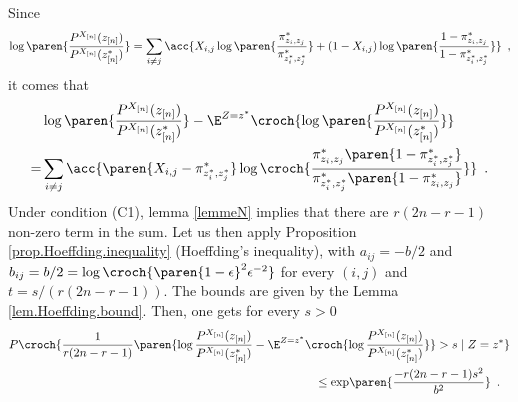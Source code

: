 \documentclass[11pt]{article}
\newcommand{\Xn}{X_{[n]}}
\newcommand{\zn}{z_{[n]}}
\newcommand{\PXn}{P^{\Xn}}
\begin{document}
Since
\begin{align*}
        \log \paren{\frac{\PXn(\zn)}{\PXn(\zn^*)}}=\sum_{i\neq j} \acc{X_{i,j}\log\paren{\frac{\pi^*_{z_i,z_j}}{\pi^*_{z^*_i,z^*_j}}}+(1-X_{i,j})\log\paren{\frac{1-\pi^*_{z_i,z_j}}{1-\pi^*_{z^*_i,z^*_j}}}}\enspace,
\end{align*}
it comes that
\begin{align*}
        & \log \paren{\frac{\PXn(\zn)}{\PXn(\zn^*)}}-\E^{Z=z^*}\croch{\log \paren{\frac{\PXn(\zn)}{\PXn(\zn^*)}}}  \\
= & \sum_{i\neq j} \acc{\paren{X_{i,j}-\pi^*_{z^*_i,z^*_j}}\log\croch{\frac{\pi^*_{z_i,z_j}\paren{1-\pi^*_{z^*_i,z^*_j}}}{\pi^*_{z^*_i,z^*_j}\paren{1-\pi^*_{z_i,z_j}}}}}\enspace.
\end{align*}
%
Under condition (C1), lemma \ref{lemmeN} implies that there are $r(2n-r-1)$ non-zero term in the sum. Let us then apply Proposition \ref{prop.Hoeffding.inequality} (Hoeffding's inequality), with $a_{ij}=-b/2$ and $b_{ij}=b/2=\log \croch{ \paren{1-\epsilon}^2{\epsilon}^{-2}}$ for every $(i,j)$ and $t=s/(r(2n-r-1))$. The bounds are given by the Lemma \ref{lem.Hoeffding.bound}.
%
Then, one gets for every $s>0$
\begin{align*}
        & P \croch{\frac{1}{r(2n-r-1)} \paren{\log \frac{\PXn(\zn)}{\PXn(\zn^*)} - \E^{Z=z^*}
\croch{ \log \frac{\PXn(\zn)}{\PXn(\zn^*)}}} > s \mid Z=z^*}  \\
 & \hspace*{9cm} \leq \mathrm{exp}\paren{\frac{-r(2n-r-1)s^2}{b^2}}\enspace.
\end{align*}
\end{document}
